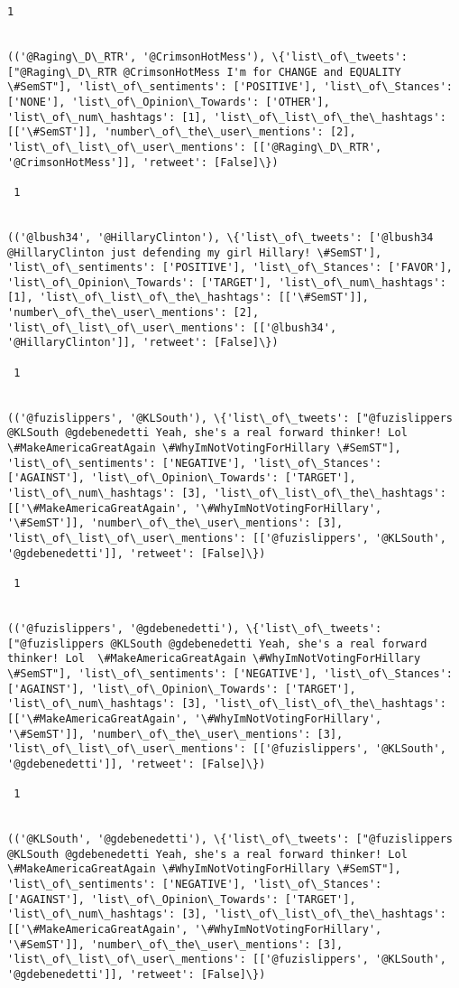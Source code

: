 \documentclass[11pt]{article}
\begin{document}
\begin{Verbatim}[commandchars=\\\{\}]
 1
 

(('@Raging\_D\_RTR', '@CrimsonHotMess'), \{'list\_of\_tweets': ["@Raging\_D\_RTR @CrimsonHotMess I'm for CHANGE and EQUALITY \#SemST"], 'list\_of\_sentiments': ['POSITIVE'], 'list\_of\_Stances': ['NONE'], 'list\_of\_Opinion\_Towards': ['OTHER'], 'list\_of\_num\_hashtags': [1], 'list\_of\_list\_of\_the\_hashtags': [['\#SemST']], 'number\_of\_the\_user\_mentions': [2], 'list\_of\_list\_of\_user\_mentions': [['@Raging\_D\_RTR', '@CrimsonHotMess']], 'retweet': [False]\})

 1
 

(('@lbush34', '@HillaryClinton'), \{'list\_of\_tweets': ['@lbush34 @HillaryClinton just defending my girl Hillary! \#SemST'], 'list\_of\_sentiments': ['POSITIVE'], 'list\_of\_Stances': ['FAVOR'], 'list\_of\_Opinion\_Towards': ['TARGET'], 'list\_of\_num\_hashtags': [1], 'list\_of\_list\_of\_the\_hashtags': [['\#SemST']], 'number\_of\_the\_user\_mentions': [2], 'list\_of\_list\_of\_user\_mentions': [['@lbush34', '@HillaryClinton']], 'retweet': [False]\})

 1
 

(('@fuzislippers', '@KLSouth'), \{'list\_of\_tweets': ["@fuzislippers @KLSouth @gdebenedetti Yeah, she's a real forward thinker! Lol  \#MakeAmericaGreatAgain \#WhyImNotVotingForHillary \#SemST"], 'list\_of\_sentiments': ['NEGATIVE'], 'list\_of\_Stances': ['AGAINST'], 'list\_of\_Opinion\_Towards': ['TARGET'], 'list\_of\_num\_hashtags': [3], 'list\_of\_list\_of\_the\_hashtags': [['\#MakeAmericaGreatAgain', '\#WhyImNotVotingForHillary', '\#SemST']], 'number\_of\_the\_user\_mentions': [3], 'list\_of\_list\_of\_user\_mentions': [['@fuzislippers', '@KLSouth', '@gdebenedetti']], 'retweet': [False]\})

 1
 

(('@fuzislippers', '@gdebenedetti'), \{'list\_of\_tweets': ["@fuzislippers @KLSouth @gdebenedetti Yeah, she's a real forward thinker! Lol  \#MakeAmericaGreatAgain \#WhyImNotVotingForHillary \#SemST"], 'list\_of\_sentiments': ['NEGATIVE'], 'list\_of\_Stances': ['AGAINST'], 'list\_of\_Opinion\_Towards': ['TARGET'], 'list\_of\_num\_hashtags': [3], 'list\_of\_list\_of\_the\_hashtags': [['\#MakeAmericaGreatAgain', '\#WhyImNotVotingForHillary', '\#SemST']], 'number\_of\_the\_user\_mentions': [3], 'list\_of\_list\_of\_user\_mentions': [['@fuzislippers', '@KLSouth', '@gdebenedetti']], 'retweet': [False]\})

 1
 

(('@KLSouth', '@gdebenedetti'), \{'list\_of\_tweets': ["@fuzislippers @KLSouth @gdebenedetti Yeah, she's a real forward thinker! Lol  \#MakeAmericaGreatAgain \#WhyImNotVotingForHillary \#SemST"], 'list\_of\_sentiments': ['NEGATIVE'], 'list\_of\_Stances': ['AGAINST'], 'list\_of\_Opinion\_Towards': ['TARGET'], 'list\_of\_num\_hashtags': [3], 'list\_of\_list\_of\_the\_hashtags': [['\#MakeAmericaGreatAgain', '\#WhyImNotVotingForHillary', '\#SemST']], 'number\_of\_the\_user\_mentions': [3], 'list\_of\_list\_of\_user\_mentions': [['@fuzislippers', '@KLSouth', '@gdebenedetti']], 'retweet': [False]\})


\end{Verbatim}
\end{document}
